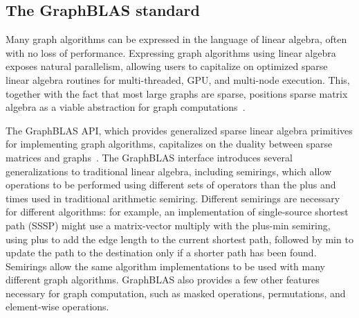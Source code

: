 \documentclass{article}
\begin{document}



\subsection{The GraphBLAS standard}

Many graph algorithms can be expressed in the language of linear algebra, often with no loss of performance. Expressing graph algorithms using linear algebra exposes natural parallelism, allowing users to capitalize on optimized sparse linear algebra routines for multi-threaded, GPU, and multi-node execution. This, together with the fact that most large graphs are sparse, positions sparse matrix algebra as a viable abstraction for graph computations~\cite{kepner2011graph, bulucc2011combinatorial}. 

The GraphBLAS API, which provides generalized sparse linear algebra primitives for implementing graph algorithms, capitalizes on the duality between sparse matrices and graphs~\cite{brock2021graphblas}. The GraphBLAS interface introduces several generalizations to traditional linear algebra, including semirings, which allow operations to be performed using different sets of operators than the plus and times used in traditional arithmetic semiring.  Different semirings are necessary for different algorithms: for example, an implementation of single-source shortest path (SSSP) might use a matrix-vector multiply with the plus-min semiring, using plus to add the edge length to the current shortest path, followed by min to update the path to the destination only if a shorter path has been found.  Semirings allow the same algorithm implementations to be used with many different graph algorithms.  GraphBLAS also provides a few other features necessary for graph computation, such as masked operations, permutations, and element-wise operations.
\end{document}
